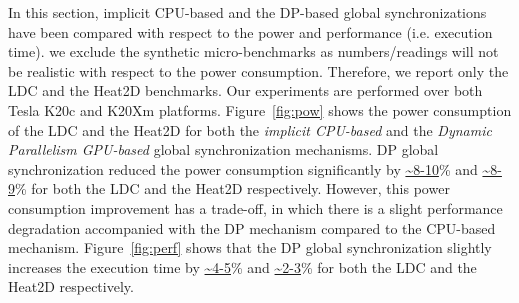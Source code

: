 \documentclass[conference]{IEEEtran}
\begin{document}
In this section, implicit CPU-based and the DP-based global synchronizations have been compared with respect to the power and performance (i.e. execution time). we exclude the synthetic micro-benchmarks as numbers/readings will not be realistic with respect to the power consumption. Therefore, we report only the LDC and the Heat2D benchmarks. Our experiments are performed over both Tesla K20c and K20Xm platforms. Figure~\ref{fig:pow} shows the power consumption of the LDC and the Heat2D for both the \emph{implicit CPU-based} and the \emph{Dynamic Parallelism GPU-based} global synchronization mechanisms. DP global synchronization reduced the power consumption significantly by \url{~8-10}\% and \url{~8-9}\% for both the LDC and the Heat2D respectively. However, this power consumption improvement has a trade-off, in which there is a slight performance degradation accompanied with the DP mechanism compared to the CPU-based mechanism. Figure~\ref{fig:perf} shows that the DP global synchronization slightly increases the execution time by \url{~4-5}\% and \url{~2-3}\% for both the LDC and the Heat2D respectively.  

\end{document}
